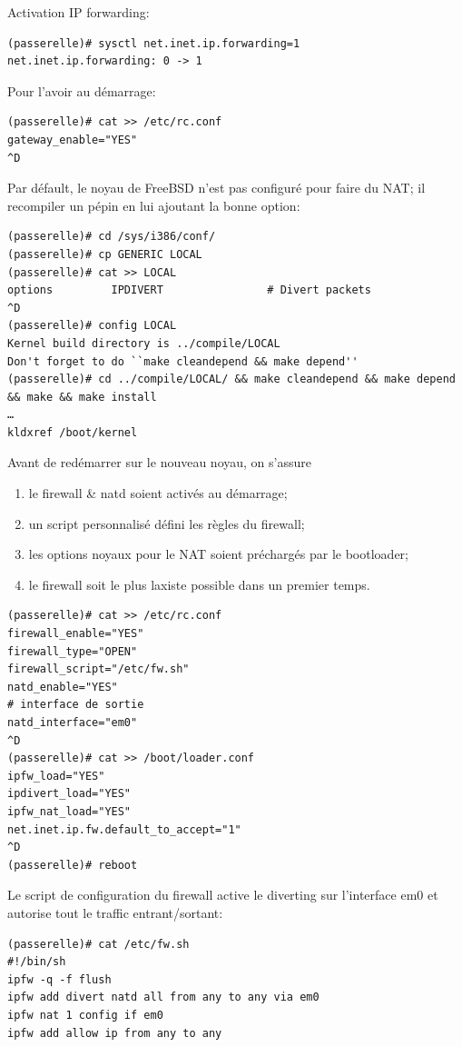 \documentclass[a4paper]{article}
\begin{document}
Activation IP forwarding:
\begin{verbatim}
(passerelle)# sysctl net.inet.ip.forwarding=1
net.inet.ip.forwarding: 0 -> 1
\end{verbatim}

Pour l'avoir au démarrage:
\begin{verbatim}
(passerelle)# cat >> /etc/rc.conf
gateway_enable="YES"
^D
\end{verbatim}

Par défault, le noyau de FreeBSD n'est pas configuré pour
faire du NAT; il recompiler un pépin en lui ajoutant la
bonne option:
\begin{verbatim}
(passerelle)# cd /sys/i386/conf/
(passerelle)# cp GENERIC LOCAL
(passerelle)# cat >> LOCAL
options         IPDIVERT                # Divert packets
^D
(passerelle)# config LOCAL
Kernel build directory is ../compile/LOCAL
Don't forget to do ``make cleandepend && make depend''
(passerelle)# cd ../compile/LOCAL/ && make cleandepend && make depend && make && make install
…
kldxref /boot/kernel
\end{verbatim}

Avant de redémarrer sur le nouveau noyau, on s'assure
\begin{enumerate}
	\item le firewall \& natd soient activés au démarrage;
	\item un script personnalisé défini les règles du firewall;
	\item les options noyaux pour le NAT soient préchargés par le bootloader;
	\item le firewall soit le plus laxiste possible dans un premier temps.
\end{enumerate}
\begin{verbatim}
(passerelle)# cat >> /etc/rc.conf
firewall_enable="YES"
firewall_type="OPEN"
firewall_script="/etc/fw.sh"
natd_enable="YES"
# interface de sortie
natd_interface="em0"
^D
(passerelle)# cat >> /boot/loader.conf
ipfw_load="YES"
ipdivert_load="YES"
ipfw_nat_load="YES"
net.inet.ip.fw.default_to_accept="1"
^D
(passerelle)# reboot
\end{verbatim}

Le script de configuration du firewall active le diverting sur
l'interface em$0$ et autorise tout le traffic entrant/sortant:
\begin{verbatim}
(passerelle)# cat /etc/fw.sh 
#!/bin/sh
ipfw -q -f flush
ipfw add divert natd all from any to any via em0
ipfw nat 1 config if em0
ipfw add allow ip from any to any
\end{verbatim}
\end{document}
